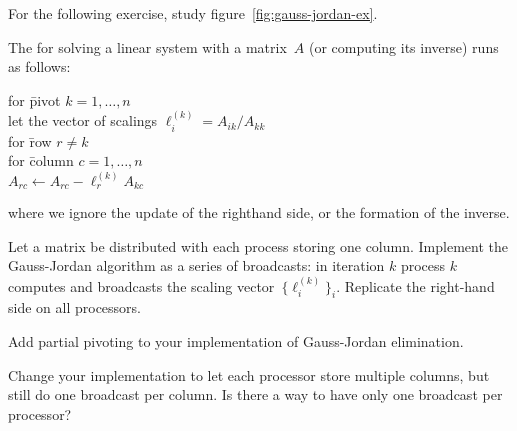 For the following exercise, study figure~\ref{fig:gauss-jordan-ex}.

\begin{exercise}
  \label{ex:gaussjordancoll}
  The  for solving a linear system
  with a matrix~$A$ (or computing its inverse) runs as follows:
  \begin{tabbing}
    for \=pivot $k=1,\ldots,n$\\
    \>let the vector of scalings $\ell^{(k)}_i=A_{ik}/A_{kk}$\\
    \>for \=row $r\not=k$\\
    \>\>for \=column $c=1,\ldots,n$\\
    \>\>\> $A_{rc}\leftarrow A_{rc} - \ell^{(k)}_r A_{kc}$\\
  \end{tabbing}
  where we ignore the update of the righthand side, or the formation
  of the inverse.

  Let a matrix be distributed with each process storing one
  column. Implement the Gauss-Jordan algorithm as a series of
  broadcasts: in iteration $k$ process $k$ computes and broadcasts the
  scaling vector~$\{\ell^{(k)}_i\}_i$. Replicate the right-hand side on
  all processors.
\end{exercise}

\begin{exercise}
  Add partial pivoting to your implementation of Gauss-Jordan elimination.

  Change your implementation to let each processor store multiple columns,
  but still do one broadcast per column. Is there a way to have only one
  broadcast per processor?
\end{exercise}


